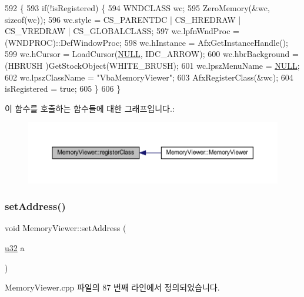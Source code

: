 \begin{DoxyCode}
592 \{
593   \textcolor{keywordflow}{if}(!isRegistered) \{
594     WNDCLASS wc;
595     ZeroMemory(&wc, \textcolor{keyword}{sizeof}(wc));
596     wc.style = CS\_PARENTDC | CS\_HREDRAW | CS\_VREDRAW | CS\_GLOBALCLASS;
597     wc.lpfnWndProc = (WNDPROC)::DefWindowProc;
598     wc.hInstance = AfxGetInstanceHandle();
599     wc.hCursor = LoadCursor(\mbox{\hyperlink{getopt1_8c_a070d2ce7b6bb7e5c05602aa8c308d0c4}{NULL}}, IDC\_ARROW);
600     wc.hbrBackground = (HBRUSH )GetStockObject(WHITE\_BRUSH);
601     wc.lpszMenuName = \mbox{\hyperlink{getopt1_8c_a070d2ce7b6bb7e5c05602aa8c308d0c4}{NULL}};
602     wc.lpszClassName = \textcolor{stringliteral}{"VbaMemoryViewer"};
603     AfxRegisterClass(&wc);
604     isRegistered = \textcolor{keyword}{true};
605   \}
606 \}
\end{DoxyCode}
이 함수를 호출하는 함수들에 대한 그래프입니다.\+:
\nopagebreak
\begin{figure}[H]
\begin{center}
\leavevmode
\includegraphics[width=350pt]{class_memory_viewer_af3d30272c691967ea6a4cc37ceb87595_icgraph}
\end{center}
\end{figure}
\mbox{\label{class_memory_viewer_abe391051455e116889da0613c19888a2}} 
\subsubsection{\texorpdfstring{set\+Address()}{setAddress()}}
{\footnotesize\ttfamily void Memory\+Viewer\+::set\+Address (\begin{DoxyParamCaption}\item[{\mbox{\hyperlink{_system_8h_a10e94b422ef0c20dcdec20d31a1f5049}{u32}}}]{a }\end{DoxyParamCaption})}



Memory\+Viewer.\+cpp 파일의 87 번째 라인에서 정의되었습니다.



